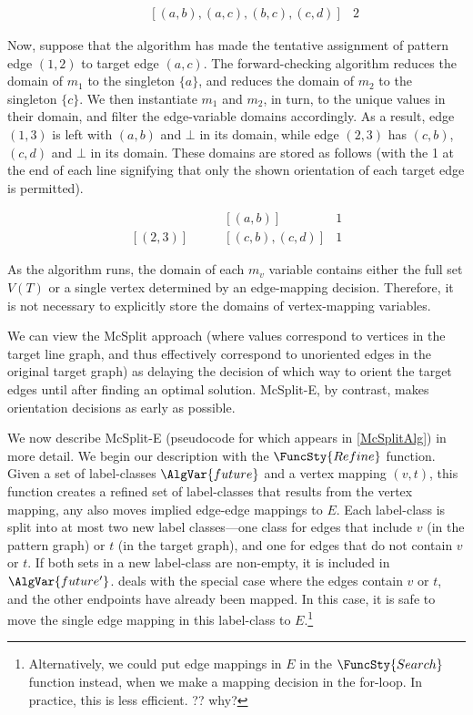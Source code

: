 \begin{align*}
    [(1,2), (1,3), (2,3)] & \qquad [(a,b), (a,c), (b,c), (c,d)] & 2
\end{align*}

Now, suppose that the algorithm has made the tentative assignment of pattern edge $(1,2)$ to target edge $(a,c)$.
The forward-checking algorithm reduces the domain of $m_1$ to the singleton $\{a\}$, and reduces
the domain of $m_2$ to the singleton $\{c\}$.  We then instantiate $m_1$ and $m_2$, in turn, to
the unique values in their domain, and filter the edge-variable domains accordingly.  As a result,
edge $(1,3)$ is left with $(a,b)$ and $\bot$ in its domain, while edge $(2,3)$ has $(c,b)$, $(c,d)$
and $\bot$ in its domain.  These domains are stored as follows (with the 1 at the end of
each line signifying that only the shown orientation of each target edge is permitted).

\begin{align*}
    [(1,3)] & \qquad [(a,b)]        & 1 \\
    [(2,3)] & \qquad [(c,b), (c,d)] & 1
\end{align*}

As the algorithm runs, the domain of each $m_v$ variable contains either the full set $V(T)$ or
a single vertex determined by an edge-mapping decision.  Therefore, it is not necessary to explicitly
store the domains of vertex-mapping variables.

We can view the McSplit approach (where values correspond to vertices in the target line graph, and
thus effectively correspond to unoriented edges in the original target graph)
as delaying the decision of which way to orient the target
edges until after finding an optimal solution.
McSplit-E, by contrast, makes orientation decisions as early as possible.

We now describe McSplit-E (pseudocode for which appears in \cref{McSplitAlg})
in more detail.
We begin our description with the $\FuncSty{Refine}$ function.  Given a set of label-classes
$\AlgVar{future}$ and a vertex mapping $(v,t)$, this function
creates a refined set of label-classes that results from the vertex mapping,
any also moves implied edge-edge mappings to $E$.  Each label-class is split into at most
two new label classes---one class for edges that include $v$ (in the pattern graph) or $t$
(in the target graph), and one for edges that do not contain $v$ or $t$.  If both sets in a new
label-class are non-empty, it is included in $\AlgVar{future'}$.   deals with the
special case where the edges contain $v$ or $t$, and the other endpoints have already been mapped.
In this case, it is safe to move the single edge mapping in this label-class to $E$.\footnote{Alternatively,
we could put edge mappings in $E$ in the $\FuncSty{Search}$ function instead, when we make a mapping decision
in the for-loop.  In practice, this is less efficient.  ?? why?}

